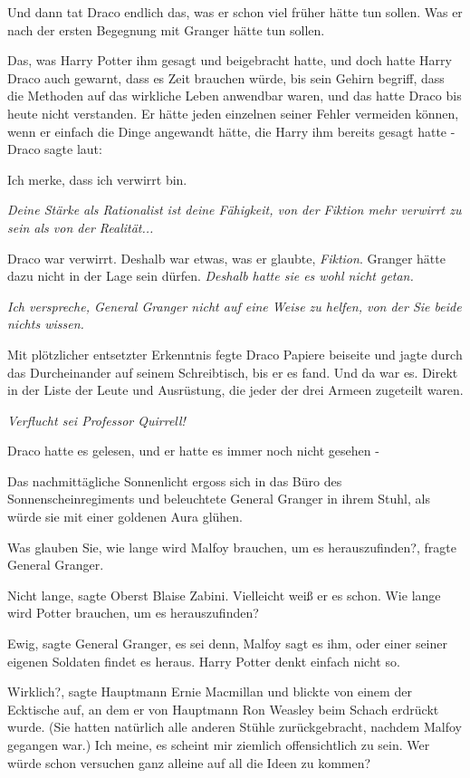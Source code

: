 Und dann tat Draco endlich das, was er schon viel früher hätte tun sollen. Was
er nach der ersten Begegnung mit Granger hätte tun sollen.

Das, was Harry Potter ihm gesagt und beigebracht hatte, und doch hatte Harry
Draco auch gewarnt, dass es Zeit brauchen würde, bis sein Gehirn begriff, dass
die Methoden auf das wirkliche Leben anwendbar waren, und das hatte Draco bis
heute nicht verstanden. Er hätte jeden einzelnen seiner Fehler vermeiden können,
wenn er einfach die Dinge angewandt hätte, die Harry ihm bereits gesagt hatte -
Draco sagte laut:

\glqq{}Ich merke, dass ich verwirrt bin.\grqq{}

\emph{Deine Stärke als Rationalist ist deine Fähigkeit, von der Fiktion mehr
verwirrt zu sein als von der Realität...}

Draco war verwirrt. Deshalb war etwas, was er glaubte, \emph{Fiktion}.
Granger hätte dazu nicht in der Lage sein dürfen.
\emph{Deshalb hatte sie es wohl nicht getan.}

\emph{Ich verspreche, General Granger nicht auf eine Weise zu helfen, von der
Sie beide nichts wissen.}

Mit plötzlicher entsetzter Erkenntnis fegte Draco Papiere beiseite und jagte
durch das Durcheinander auf seinem Schreibtisch, bis er es fand. Und da war es.
Direkt in der Liste der Leute und Ausrüstung, die jeder der drei Armeen
zugeteilt waren.

\emph{Verflucht sei Professor Quirrell!}

Draco hatte es gelesen, und er hatte es immer noch nicht gesehen -

Das nachmittägliche Sonnenlicht ergoss sich in das Büro des
Sonnenscheinregiments und beleuchtete General Granger in ihrem Stuhl, als würde
sie mit einer goldenen Aura glühen.

\glqq{}Was glauben Sie, wie lange wird Malfoy brauchen, um es
herauszufinden?\grqq{}, fragte General Granger.

\glqq{}Nicht lange\grqq{}, sagte Oberst Blaise Zabini. \glqq{}Vielleicht weiß er
es schon. Wie lange wird Potter brauchen, um es herauszufinden?\grqq{}

\glqq{}Ewig\grqq{}, sagte General Granger, \glqq{}es sei denn, Malfoy sagt es ihm,
oder einer seiner eigenen Soldaten findet es heraus. Harry Potter denkt einfach
nicht so.\grqq{}

\glqq{}Wirklich?\grqq{}, sagte Hauptmann Ernie Macmillan und blickte von einem
der Ecktische auf, an dem er von Hauptmann Ron Weasley beim Schach erdrückt
wurde. (Sie hatten natürlich alle anderen Stühle zurückgebracht, nachdem Malfoy
gegangen war.) \glqq{}Ich meine, es scheint mir ziemlich offensichtlich zu sein.
Wer würde schon versuchen ganz alleine auf all die Ideen zu kommen?\grqq{}

